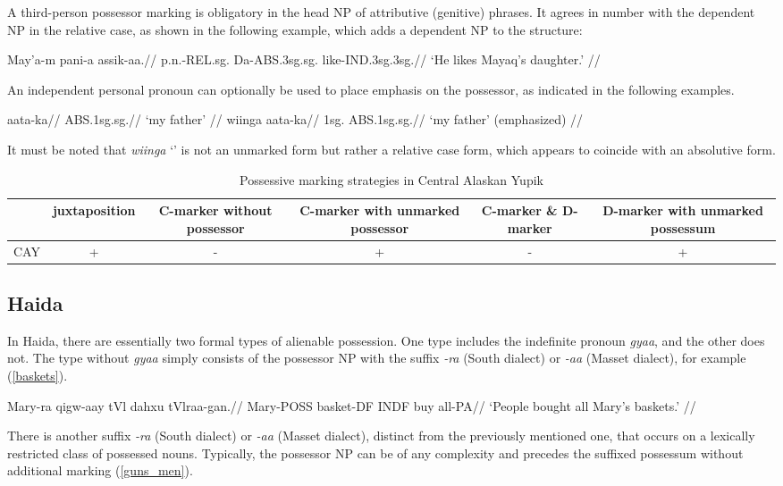 A third-person possessor marking is obligatory in the head NP of attributive (genitive) phrases. It agrees in number with the dependent NP in the relative case, as shown in the following example, which adds a dependent NP to the structure:

\ex
\begingl
\gla May’a-m pani-a assik-aa.//
\glb p.n.-REL.sg. Da-ABS.3sg.sg. like-IND.3sg.3sg.//
\glft ‘He likes Mayaq’s daughter.’ //
\endgl
\xe

An independent personal pronoun can optionally be used to place emphasis on the possessor, as indicated in the following examples.

\pex
\a
\begingl
\gla aata-ka//
\glb ABS.1sg.sg.//
\glft ‘my father’ //
\endgl
\a
\begingl
\gla wiinga aata-ka//
\glb 1sg. ABS.1sg.sg.//
\glft ‘my father’ (emphasized) //
\endgl
\xe 

It must be noted that \textit{wiinga} `\Fsg' is not an unmarked form but rather a relative case form, which appears to coincide with an absolutive form.

\begin{table}[h!]
	\centering
	\small
	\begin{tabular}{@{}cccccc@{}}
		\toprule
		& juxtaposition & \parbox{2.5cm}{C-marker without possessor} & \parbox{2.75cm}{C-marker with unmarked possessor} & \parbox{1.75cm}{C-marker \& D-marker} & \parbox{3cm}{D-marker with unmarked possessum} \\ \midrule
		CAY & + & - & + & - & + \\ \bottomrule
	\end{tabular}
	\caption{Possessive marking strategies in Central Alaskan Yupik}
\end{table}

\subsection{Haida}

In Haida, there are essentially two formal types of alienable possession. One type includes the indefinite pronoun \textit{gyaa}, and the other does not. The type without \textit{gyaa} simply consists of the possessor NP with the suffix \textit{-ra} (South dialect) or \textit{-aa} (Masset dialect), for example (\ref{baskets}).

\ex\label{baskets}
\begingl
\gla Mary-ra qigw-aay tVl dahxu tVlraa-gan.//
\glb Mary-POSS basket-DF INDF buy all-PA//
\glft ‘People bought all Mary’s baskets.’ //
\endgl
\xe

There is another suffix \textit{-ra} (South dialect) or \textit{-aa} (Masset dialect), distinct from the previously mentioned one, that occurs on a lexically restricted class of possessed nouns. Typically, the possessor NP can be of any complexity and precedes the suffixed possessum without additional marking (\ref{guns_men}).


